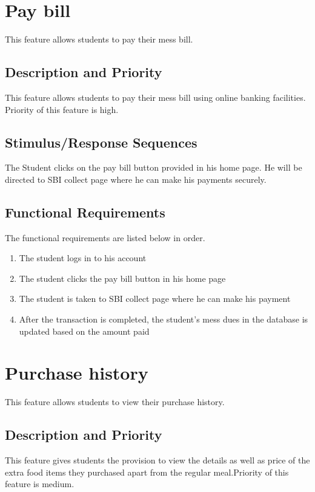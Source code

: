 \documentclass{scrreprt}
\begin{document}
\section{Pay bill}
This feature allows students to pay their mess bill.

\subsection{Description and Priority}
This feature allows students to pay their mess bill using online banking facilities. Priority of this feature is high.


\subsection{Stimulus/Response Sequences}
The Student clicks on the pay bill button provided in his home page. He will be directed to SBI collect page where he can make his payments securely.

\subsection{Functional Requirements}
The functional requirements are listed below in order.

\begin{enumerate}
    \item The student logs in to his account 
    \item The student clicks the pay bill button in his home page
    \item The student is taken to SBI collect page where he can make his payment
    \item After the transaction is completed, the student's mess dues in the database is updated based on the amount paid
\end{enumerate} 

\section{Purchase history}
This feature allows students to view their purchase history.

\subsection{Description and Priority}
This feature gives students the provision to view the details  as well as price of the extra food items they purchased apart from the regular meal.Priority of this feature is medium.
\end{document}
